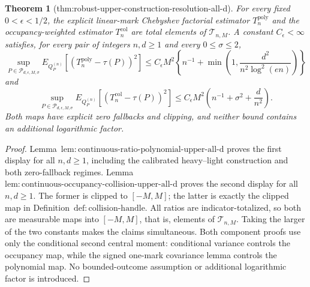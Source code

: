 \documentclass{article}
\newtheorem{theorem}{Theorem}
\begin{document}
\begin{theorem}[thm:robust-upper-construction-resolution-all-d]\label{thm:robust-upper-construction-resolution-all-d}
For every fixed \(0<\epsilon<1/2\), the explicit linear-mark Chebyshev factorial estimator \(T_n^{\mathrm{poly}}\) and the occupancy-weighted estimator \(T_n^{\mathrm{col}}\) are total elements of \(\mathcal T_{n,M}\).  A constant \(C_{\epsilon}<\infty\) satisfies, for every pair of integers \(n,d\ge1\) and every \(0\le\sigma\le2\),
\[
 \sup_{P\in\mathcal P_{d,\epsilon,M,\sigma}}
 E_{Q_P^{(n)}}[(T_n^{\mathrm{poly}}-\tau(P))^2]
 \le C_{\epsilon}M^2\left\{n^{-1}+\min\left(1,\frac{d^2}{n^2\log^2(en)}\right)\right\}
\]
and
\[
 \sup_{P\in\mathcal P_{d,\epsilon,M,\sigma}}
 E_{Q_P^{(n)}}[(T_n^{\mathrm{col}}-\tau(P))^2]
 \le C_{\epsilon}M^2\left(n^{-1}+\sigma^2+\frac d{n^2}\right).
\]
Both maps have explicit zero fallbacks and clipping, and neither bound contains an additional logarithmic factor.
\end{theorem}
\begin{proof}
Lemma~\(\mathrm{lem:continuous\text{-}ratio\text{-}polynomial\text{-}upper\text{-}all\text{-}d}\) proves the first display for all \(n,d\ge1\), including the calibrated heavy--light construction and both zero-fallback regimes.  Lemma~\(\mathrm{lem:continuous\text{-}occupancy\text{-}collision\text{-}upper\text{-}all\text{-}d}\) proves the second display for all \(n,d\ge1\).  The former is clipped to \([-M,M]\); the latter is exactly the clipped map in Definition~\(\mathrm{def:collision\text{-}handle}\).  All ratios are indicator-totalized, so both are measurable maps into \([-M,M]\), that is, elements of \(\mathcal T_{n,M}\).  Taking the larger of the two constants makes the claims simultaneous.  Both component proofs use only the conditional second central moment: conditional variance controls the occupancy map, while the signed one-mark covariance lemma controls the polynomial map.  No bounded-outcome assumption or additional logarithmic factor is introduced.
\end{proof}
\end{document}
